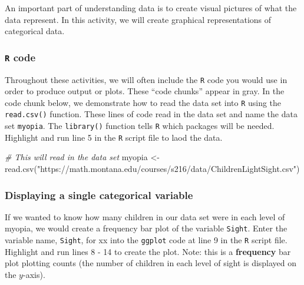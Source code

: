 \documentclass[
]{report}
\newenvironment{Shaded}{\begin{snugshade}}{\end{snugshade}}
\newcommand{\CommentTok}[1]{\textcolor[rgb]{0.56,0.35,0.01}{\textit{#1}}}
\newcommand{\FunctionTok}[1]{\textcolor[rgb]{0.00,0.00,0.00}{#1}}
\newcommand{\NormalTok}[1]{#1}
\newcommand{\OtherTok}[1]{\textcolor[rgb]{0.56,0.35,0.01}{#1}}
\newcommand{\StringTok}[1]{\textcolor[rgb]{0.31,0.60,0.02}{#1}}
\begin{document}
An important part of understanding data is to create visual pictures of what the data represent. In this activity, we will create graphical representations of categorical data.

\hypertarget{r-code}{%
\subsubsection*{\texorpdfstring{\texttt{R} code}{R code}}\label{r-code}}

Throughout these activities, we will often include the \texttt{R} code
you would use in order to produce output or plots. These
``code chunks'' appear in gray. In the code chunk below, we
demonstrate how to read the data set into \texttt{R} using the \texttt{read.csv()} function. These lines of code read in the data set and name the data set \texttt{myopia}. The \texttt{library()} function tells \texttt{R} which packages will be needed. Highlight and run line 5 in the \texttt{R} script file to laod the data.

\begin{Shaded}
\begin{Highlighting}[]
\CommentTok{\# This will read in the data set}
\NormalTok{myopia }\OtherTok{\textless{}{-}} \FunctionTok{read.csv}\NormalTok{(}\StringTok{"https://math.montana.edu/courses/s216/data/ChildrenLightSight.csv"}\NormalTok{) }
\end{Highlighting}
\end{Shaded}

\hypertarget{displaying-a-single-categorical-variable}{%
\subsubsection*{Displaying a single categorical variable}\label{displaying-a-single-categorical-variable}}

If we wanted to know how many children in our data set were in each level of myopia, we would create a frequency bar plot of the variable \texttt{Sight}. Enter the variable name, \texttt{Sight}, for xx into the \texttt{ggplot} code at line 9 in the \texttt{R} script file. Highlight and run lines 8 - 14 to create the plot. Note: this is a \textbf{frequency} bar plot plotting counts (the number of children in each level of sight is displayed on the \(y\)-axis).
\end{document}
